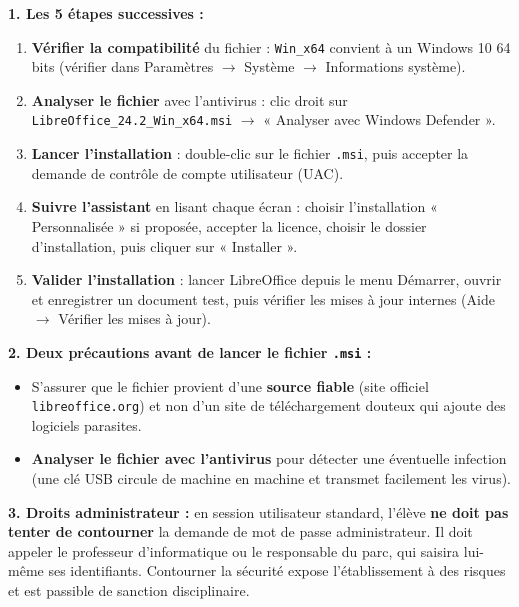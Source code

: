 \documentclass[11pt]{article}
\begin{document}
\begin{corrige}
\textbf{1. Les 5 étapes successives :}
\begin{enumerate}
    \item \textbf{Vérifier la compatibilité} du fichier : \texttt{Win\_x64} convient à un Windows 10 64 bits (vérifier dans Paramètres $\to$ Système $\to$ Informations système).
    \item \textbf{Analyser le fichier} avec l'antivirus : clic droit sur \texttt{LibreOffice\_24.2\_Win\_x64.msi} $\to$ « Analyser avec Windows Defender ».
    \item \textbf{Lancer l'installation} : double-clic sur le fichier \texttt{.msi}, puis accepter la demande de contrôle de compte utilisateur (UAC).
    \item \textbf{Suivre l'assistant} en lisant chaque écran : choisir l'installation « Personnalisée » si proposée, accepter la licence, choisir le dossier d'installation, puis cliquer sur « Installer ».
    \item \textbf{Valider l'installation} : lancer LibreOffice depuis le menu Démarrer, ouvrir et enregistrer un document test, puis vérifier les mises à jour internes (Aide $\to$ Vérifier les mises à jour).
\end{enumerate}

\textbf{2. Deux précautions avant de lancer le fichier \texttt{.msi} :}
\begin{itemize}
    \item S'assurer que le fichier provient d'une \textbf{source fiable} (site officiel \texttt{libreoffice.org}) et non d'un site de téléchargement douteux qui ajoute des logiciels parasites.
    \item \textbf{Analyser le fichier avec l'antivirus} pour détecter une éventuelle infection (une clé USB circule de machine en machine et transmet facilement les virus).
\end{itemize}

\textbf{3. Droits administrateur :} en session utilisateur standard, l'élève \textbf{ne doit pas tenter de contourner} la demande de mot de passe administrateur. Il doit appeler le professeur d'informatique ou le responsable du parc, qui saisira lui-même ses identifiants. Contourner la sécurité expose l'établissement à des risques et est passible de sanction disciplinaire.
\end{corrige}
\end{document}
